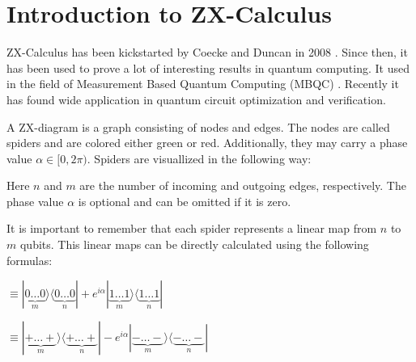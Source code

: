 \section{Introduction to ZX-Calculus}

ZX-Calculus has been kickstarted by Coecke and Duncan in 2008 \cite{Coecke2007graphicalcalculus}. Since then, it has been used to prove a lot of interesting results in quantum computing. It used in the field of Measurement Based Quantum Computing (MBQC) \cite{duncan2012graphical}. Recently \cite{vandewetering2020zxcalculus} it has found wide application in quantum circuit optimization and verification.


A ZX-diagram is a graph consisting of nodes and edges. The nodes are called spiders and are colored either green or red. Additionally, they may carry a phase value $\alpha \in [0, 2\pi)$. Spiders are visuallized in the following way:


\vspace{5pt}
\begin{ZX}
      \zxZ{\alpha} 
\end{ZX}

\vspace{5pt}


\begin{ZX}
      \zxX{\alpha} 
\end{ZX}
\vspace{5pt}


Here $n$ and $m$ are the number of incoming and outgoing edges, respectively. The phase value $\alpha$ is optional and can be omitted if it is zero.

It is important to remember that each spider represents a linear map from $n$ to $m$ qubits. This linear maps can be directly calculated using the following formulas:

\vspace{5pt}
 $\equiv |\underbrace{0\dots 0}_{m}\rangle \langle \underbrace{0\dots0}_{n}| + e^{i\alpha}|\underbrace{1\dots1}_{m}\rangle \langle \underbrace{1\dots1}_{n}|$

\vspace{5pt}
\begin{ZX}
      \zxZ{\alpha} 
\end{ZX} $\equiv |\underbrace{+\dots +}_{m}\rangle \langle \underbrace{+\dots+}_{n}| - e^{i\alpha}|\underbrace{-\dots-}_{m}\rangle \langle \underbrace{-\dots-}_{n}|$
\vspace{5pt}

